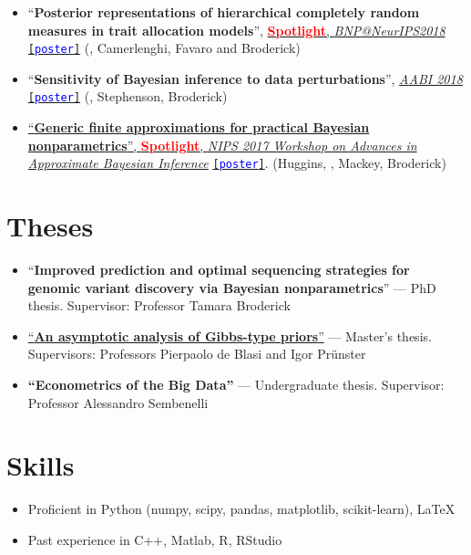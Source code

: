 \documentclass[10pt, a4paper]{article}
\newcommand{\years}[1]{\marginnote{\scriptsize #1}}
\begin{document}
\begin{itemize}
	\item``\textbf{Posterior representations of hierarchical completely random measures in trait allocation models}'', \href{https://sites.google.com/view/nipsbnp2018/accepted-papers}{\textcolor{red}{\textbf{Spotlight}}, \emph{BNP@NeurIPS2018}} \href{https://lorenzomasoero.com/files/bnp_neurips_2018_poster.pdf}{\texttt{[\textcolor{blue}{poster}]}}  (\mm, Camerlenghi, Favaro and Broderick)
 	\item ``\textbf{Sensitivity of Bayesian inference to data perturbations}'', \href{http://approximateinference.org/accepted/}{\emph{AABI 2018}} \href{https://lorenzomasoero.com/files/aabi_2018_poster.pdf}{\texttt{[\textcolor{blue}{poster}]}} (\mm, Stephenson, Broderick)
\item \href{http://www.approximateinference.org/2017/accepted/HugginsEtAl2017.pdf}{``\textbf{Generic finite approximations
for practical Bayesian nonparametrics}'', \textcolor{red}{\textbf{Spotlight}}, \emph{NIPS 2017 Workshop on Advances in Approximate Bayesian Inference}} \href{https://lorenzomasoero.com/files/aabi_2017_poster.pdf}{\texttt{[\textcolor{blue}{poster}]}}.  (Huggins, \mm, Mackey, Broderick)
\end{itemize}
\section*{Theses}
\begin{itemize}
\item ``\textbf{Improved prediction and optimal sequencing strategies for genomic variant discovery via Bayesian nonparametrics}'' --- PhD thesis. Supervisor: Professor Tamara Broderick
\item \href{http://www.mit.edu/~lom/files/MasterThesisShort.pdf}{``\textbf{An asymptotic analysis of Gibbs-type priors}''} --- Master's thesis. Supervisors: Professors Pierpaolo de Blasi and Igor Pr\"{u}nster 
\item \textbf{``Econometrics of the Big Data''} --- Undergraduate thesis. Supervisor: Professor Alessandro Sembenelli
\end{itemize}
\newpage 
\section*{Skills}
\begin{itemize}
	\item Proficient in Python (numpy, scipy, pandas, matplotlib, scikit-learn), \LaTeX
	\item Past experience in C++, Matlab, R, RStudio
\end{itemize}
\end{document}
